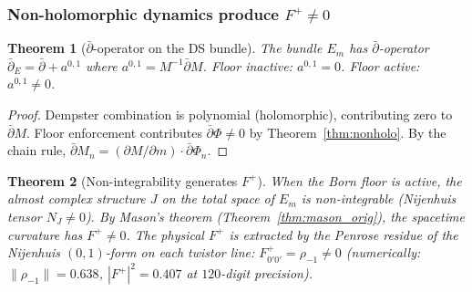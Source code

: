 \documentclass[11pt,a4paper]{article}
\newtheorem{theorem}{Theorem}[section]
\theoremstyle{definition}
\theoremstyle{remark}
\newcommand{\dbar}{\bar{\partial}}
\begin{document}
\subsubsection{Non-holomorphic dynamics produce $F^+\neq 0$}

\begin{theorem}[$\dbar$-operator on the DS bundle]\label{thm:dbar}
The bundle $E_m$ has $\dbar$-operator $\dbar_E=\dbar+a^{0,1}$ where $a^{0,1}=M^{-1}\dbar M$. Floor inactive: $a^{0,1}=0$. Floor active: $a^{0,1}\neq 0$.
\end{theorem}

\begin{proof}
Dempster combination is polynomial (holomorphic), contributing zero to $\dbar M$. Floor enforcement contributes $\dbar\Phi\neq 0$ by Theorem~\ref{thm:nonholo}. By the chain rule, $\dbar M_n=(\partial M/\partial m)\cdot\dbar\Phi_n$.
\end{proof}

\begin{theorem}[Non-integrability generates $F^+$]\label{thm:nijenhuis}
When the Born floor is active, the almost complex structure $J$ on the total space of $E_m$ is non-integrable (Nijenhuis tensor $N_J\neq 0$). By Mason's theorem (Theorem~\ref{thm:mason_orig}), the spacetime curvature has $F^+\neq 0$. The physical $F^+$ is extracted by the Penrose residue of the Nijenhuis $(0,1)$-form on each twistor line: $F^+_{0'0'}=\rho_{-1}\neq 0$ (numerically: $\|\rho_{-1}\|=0.638$, $|F^+|^2=0.407$ at $120$-digit precision).
\end{theorem}
\end{document}
